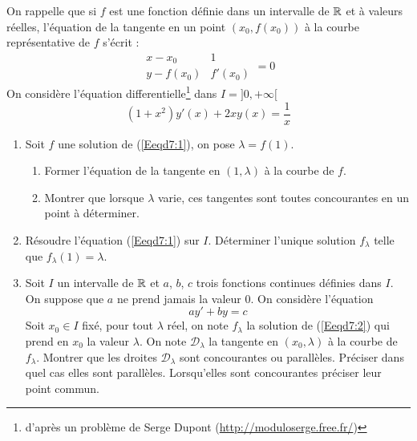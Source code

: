 On rappelle que si $f$ est une fonction définie dans un intervalle de $\mathbb{R}$ et à valeurs réelles, l'équation de la tangente en un point $(x_0,f(x_0))$ à la courbe représentative de $f$ s'écrit :
\[
\begin{array}{|cc|}
 x-x_0 & 1  \\ 
 y-f(x_0)& f'(x_0) 
\end{array}=0
\]
On considère l'équation differentielle\footnote{d'après un problème de Serge Dupont (\href{http://moduloserge.free.fr/}{http://moduloserge.free.fr/}) } dans $I=]0,+\infty[$
\begin{equation}
(1+x^2)y'(x)+2xy(x)=\frac{1}{x} \label{Eeqd7:1}
\end{equation}
\begin{enumerate}
\item Soit $f$ une solution de (\ref{Eeqd7:1}), on pose $\lambda=f(1)$.
\begin{enumerate}
\item Former l'équation de la tangente en $(1,\lambda)$ à la courbe de $f$.
\item Montrer que lorsque $\lambda$ varie, ces tangentes sont toutes concourantes en un point à déterminer.
\end{enumerate}
\item Résoudre l'équation (\ref{Eeqd7:1}) sur $I$. Déterminer l'unique solution $f_\lambda$ telle que $f_\lambda(1)=\lambda$.
\item Soit $I$ un intervalle de $\mathbb{R}$ et $a$, $b$, $c$ trois fonctions continues définies dans $I$. On suppose que $a$ ne prend jamais la valeur 0.
On considère l'équation
\begin{equation}
ay'+by=c \label{Eeqd7:2}
\end{equation}
Soit $x_0\in I$ fixé, pour tout $\lambda$ réel, on note $f_\lambda$ la solution de (\ref{Eeqd7:2}) qui prend en $x_0$ la valeur $\lambda$. On note $\mathcal{D}_\lambda$ la tangente en $(x_0,\lambda)$ à la courbe de $f_\lambda$.
Montrer que les droites $\mathcal{D}_\lambda$ sont concourantes ou parallèles. Préciser dans quel cas elles sont parallèles. Lorsqu'elles sont concourantes préciser leur point commun.


\end{enumerate}
